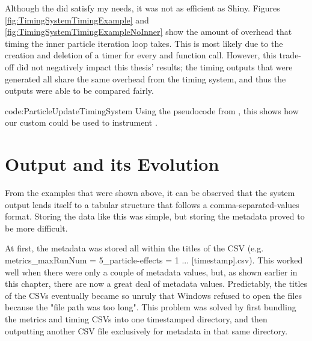 Although the  did satisfy my needs, it was not as efficient as Shiny. Figures \ref{fig:TimingSystemTimingExample} and \ref{fig:TimingSystemTimingExampleNoInner} show the amount of overhead that timing the inner particle iteration loop takes. This is most likely due to the creation and deletion of a timer for every  and  function call. However, this trade-off did not negatively impact this thesis' results; the timing outputs that were generated all share the same overhead from the timing system, and thus the outputs were able to be compared fairly.

{code:ParticleUpdateTimingSystem}
{Using the pseudocode from , this shows how our custom  could be used to instrument . }


\section{Output and its Evolution}\label{sec:instr_output}

From the examples that were shown above, it can be observed that the system output lends itself to a tabular structure that follows a comma-separated-values format. Storing the data like this was simple, but storing the metadata proved to be more difficult. 

At first, the metadata was stored all within the titles of the CSV (e.g. metrics\_maxRunNum = 5\_particle-effects = 1 ... [timestamp].csv). This worked well when there were only a couple of metadata values, but, as shown earlier in this chapter, there are now a great deal of metadata values. Predictably, the titles of the CSVs eventually became so unruly that Windows refused to open the files because the "file path was too long". This problem was solved by first bundling the metrics and timing CSVs into one timestamped directory, and then outputting another CSV file exclusively for metadata in that same directory. 

